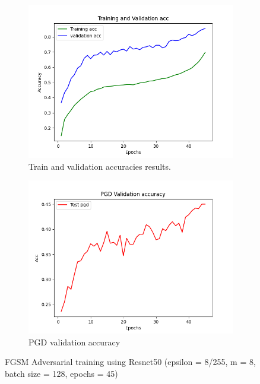 \documentclass{article}
\begin{document}
\begin{figure}[hbt!]
  \centering
  \begin{subfigure}[b]{0.4\linewidth}
    \includegraphics[width=\linewidth]{images/FastPre/fast2.png}
    \caption{ Train and validation accuracies results.}
  \end{subfigure}
  \begin{subfigure}[b]{0.4\linewidth}
    \includegraphics[width=\linewidth]{images/FastPre/fast5.png}
    \caption{PGD validation accuracy}
  \end{subfigure}
  \caption{FGSM Adversarial training using Resnet50 (epsilon = 8/255, m = 8, batch size = 128, epochs = 45)}
  \label{fig:coffee}
\end{figure}
\end{document}
